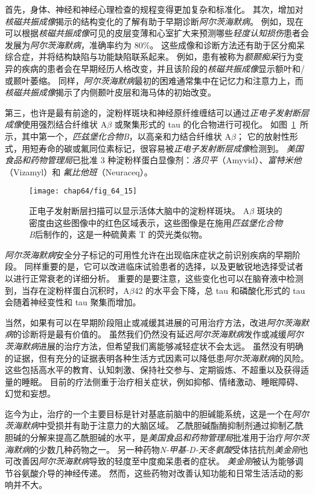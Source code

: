 首先，身体、神经和神经心理检查的规程变得更加复杂和标准化。
其次，增加对\textit{核磁共振成像}揭示的结构变化的了解有助于早期诊断\textit{阿尔茨海默病}。
例如，现在可以根据\textit{核磁共振成像}可见的皮层变薄和心室扩大来预测哪些\textit{轻度认知损伤}患者会发展为\textit{阿尔茨海默病}，准确率约为 80\%。
这些成像和诊断方法还有助于区分痴呆综合症，并将结构缺陷与功能缺陷联系起来。
例如，患有被称为\textit{额颞痴呆}行为变异的疾病的患者会在早期经历人格改变，并且该阶段的\textit{核磁共振成像}显示额叶和/或颞叶萎缩。
同样，\textit{阿尔茨海默病}最初的困难通常集中在记忆力和注意力上，而\textit{核磁共振成像}揭示了内侧颞叶皮层和海马体的初始改变。


第三，也许是最有前途的，淀粉样斑块和神经原纤维缠结可以通过\textit{正电子发射断层成像}使用强烈结合纤维状 A$\beta$ 或聚集形式的 tau 的化合物进行可视化。
如图~\ref{fig:64_15}~所示，其中第一个，\textit{匹兹堡化合物B}，以高亲和力结合纤维状 A$\beta$；
它的放射性形式，用短寿命的碳或氟同位素标记，很容易被\textit{正电子发射断层成像}检测到。
\textit{美国食品和药物管理局}已批准 3 种淀粉样蛋白显像剂：\textit{洛贝平}（Amyvid）、\textit{富特米他}（Vizamyl）和 \textit{氟比他班}（Neuraceq）。


\begin{figure}[htbp]
	\centering
	\texttt{[image: chap64/fig\_64\_15]}
	\caption{正电子发射断层扫描可以显示活体大脑中的淀粉样斑块。
		A$\beta$ 斑块的密度由这些图像中的红色区域表示，这些图像是在施用\textit{匹兹堡化合物B}后制作的，这是一种硫黄素 T 的荧光类似物。}
	\label{fig:64_15}
\end{figure}


\textit{阿尔茨海默病}安全分子标记的可用性允许在出现临床症状之前识别疾病的早期阶段。
同样重要的是，它可以改进临床试验患者的选择，以及更敏锐地选择受试者以进行正常衰老的详细分析。
重要的是要注意，这些变化也可以在脑脊液中检测到，当存在淀粉样蛋白沉积时，A$\beta$42 的水平会下降，总 tau 和磷酸化形式的 tau 会随着神经变性和 tau 聚集而增加。


当然，如果有可以在早期阶段阻止或减缓其进展的可用治疗方法，改进\textit{阿尔茨海默病}的诊断将是最有价值的。
虽然我们仍然没有延迟\textit{阿尔茨海默病}发作或减缓\textit{阿尔茨海默病}进展的治疗方法，但希望我们离能够减轻症状不会太远。
虽然没有明确的证据，但有充分的证据表明各种生活方式因素可以降低患\textit{阿尔茨海默病}的风险。
这些包括高水平的教育、认知刺激、保持社交参与、定期锻炼、不超重以及获得适量的睡眠。
目前的疗法侧重于治疗相关症状，例如抑郁、情绪激动、睡眠障碍、幻觉和妄想。


迄今为止，治疗的一个主要目标是针对基底前脑中的胆碱能系统，这是一个在\textit{阿尔茨海默病}中受损并有助于注意力的大脑区域。
乙酰胆碱酯酶抑制剂通过抑制乙酰胆碱的分解来提高乙酰胆碱的水平，是\textit{美国食品和药物管理局}批准用于治疗\textit{阿尔茨海默病}的少数几种药物之一。
另一种药物\textit{N-甲基-D-天冬氨酸}受体拮抗剂\textit{美金刚}也可改善因\textit{阿尔茨海默病}导致的轻度至中度痴呆患者的症状。
\textit{美金刚}被认为能够调节谷氨酸介导的神经传递。
然而，这些药物对改善认知功能和日常生活活动的影响并不大。


